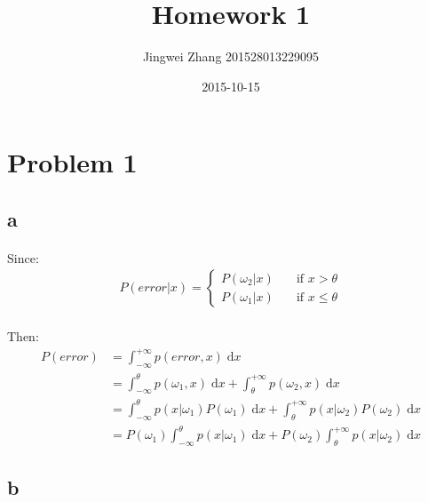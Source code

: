 \documentclass[]{article}
\title{Homework 1}
\date{2015-10-15}
\author{Jingwei Zhang 201528013229095}
\begin{document}
    \maketitle
    \section{Problem 1}
        \subsection{a}
            \paragraph{}Since:
                \begin{align*}
                    P(error|x) = 
                        \begin{cases}
                            P(\omega_2 | x) &\quad \text{if }x>\theta \\
                            P(\omega_1 | x) &\quad \text{if }x \leq \theta
                        \end{cases}
                \end{align*}
            \paragraph{}Then:
                \begin{align*}
                    P(error) &= \int_{-\infty}^{+\infty} p(error,x)  \; \mathrm{d}x \\
                             &= \int_{-\infty}^{\theta} p(\omega_1,x)  \; \mathrm{d}x + \int_{\theta}^{+\infty} p(\omega_2,x)  \; \mathrm{d}x \\
                             &= \int_{-\infty}^{\theta} p(x|\omega_1)P(\omega_1)  \; \mathrm{d}x 
                              + \int_{\theta}^{+\infty} p(x|\omega_2)P(\omega_2)  \; \mathrm{d}x \\
                             &= P(\omega_1)\int_{-\infty}^{\theta} p(x|\omega_1)  \; \mathrm{d}x 
                              + P(\omega_2)\int_{\theta}^{+\infty} p(x|\omega_2)  \; \mathrm{d}x
                \end{align*}
        \subsection{b}
\end{document}

